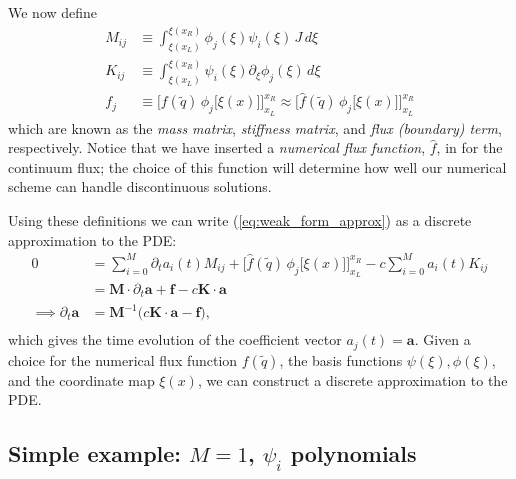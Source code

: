 \documentclass[12pt]{article}
\numberwithin{equation}{section}
\begin{document}
We now define
\begin{equation}
\begin{aligned}
M_{ij} &\equiv \int_{\xi(x_L)}^{\xi(x_R)} \phi_j(\xi) \psi_i(\xi) \, J \, d\xi \\
K_{ij} &\equiv \int_{\xi(x_L)}^{\xi(x_R)} \psi_i(\xi) \partial_\xi \phi_j(\xi) \, d \xi \\
f_j    &\equiv \Big[ f(\tilde{q}) \, \phi_j\big[ \xi(x) \big] \Big]^{x_R}_{x_L} \approx \Big[ \hat{f}(\tilde{q}) \, \phi_j\big[ \xi(x) \big] \Big]^{x_R}_{x_L}
\end{aligned}
\end{equation}
which are known as the \textit{mass matrix}, \textit{stiffness matrix}, and \textit{flux (boundary) term}, respectively. 
Notice that we have inserted a \textit{numerical flux function}, $\hat{f}$, in for the continuum flux; the choice of this function will determine how well our numerical scheme can handle discontinuous solutions.

Using these definitions we can write (\ref{eq:weak_form_approx}) as a discrete approximation to the PDE:
\begin{equation} \label{eq:discrete_approx}
\begin{aligned}
0 &= \sum_{i=0}^{M} \partial_t a_i(t) M_{ij} + \Big[ \hat{f}(\tilde{q}) \, \phi_j\big[ \xi(x) \big] \Big]^{x_R}_{x_L} - c \sum_{i=0}^{M} a_i(t) K_{ij} \\
&= \bm{M} \cdot \partial_t \bm{a} + \bm{f} - c \bm{K} \cdot \bm{a} \\
\implies \partial_t \bm{a} &= \bm{M}^{-1} \Big( c \bm{K} \cdot \bm{a} - \bm{f} \Big), \\
\end{aligned}
\end{equation}
which gives the time evolution of the coefficient vector $a_j(t) = \bm{a}$.
Given a choice for the numerical flux function $f(\tilde{q})$, the basis functions $\psi(\xi), \phi(\xi)$, and the coordinate map $\xi(x)$, we can construct a discrete approximation to the PDE.


\subsection{Simple example: $M=1$, $\psi_i$ polynomials}
\end{document}
